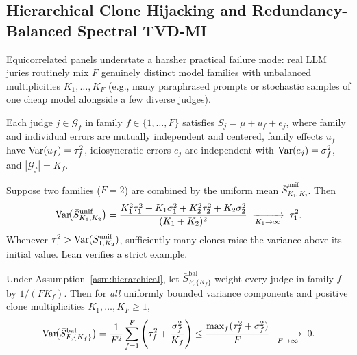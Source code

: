 \subsection{Hierarchical Clone Hijacking and Redundancy-Balanced Spectral TVD-MI}
\label{sec:rb-spec}

Equicorrelated panels understate a harsher practical failure mode: real LLM
juries routinely mix $F$ genuinely distinct model families with unbalanced
multiplicities $K_1, \dots, K_F$ (e.g., many paraphrased prompts or stochastic
samples of one cheap model alongside a few diverse judges).

\begin{assumption}
\label{asm:hierarchical}
Each judge $j \in \mathcal{G}_f$ in family $f \in \{1,\dots,F\}$ satisfies
$S_j = \mu + u_f + e_j$, where family and individual errors are mutually independent and centered, family effects $u_f$ have
$\mathrm{Var}(u_f) = \tau_f^2$, idiosyncratic errors $e_j$ are independent with
$\mathrm{Var}(e_j) = \sigma_f^2$, and $|\mathcal{G}_f| = K_f$.
\end{assumption}

\begin{proposition}
\label{prop:clone-hijacking}
Suppose two families ($F=2$) are combined by the uniform mean
$\bar{S}^{\mathrm{unif}}_{K_1, K_2}$. Then
\begin{equation}
\label{eq:clone-hijack}
\mathrm{Var}\!\big(\bar{S}^{\mathrm{unif}}_{K_1, K_2}\big)
= \frac{K_1^2 \tau_1^2 + K_1 \sigma_1^2 + K_2^2 \tau_2^2 + K_2 \sigma_2^2}{(K_1 + K_2)^2}
\;\xrightarrow[K_1 \to \infty]{}\; \tau_1^2.
\end{equation}
Whenever $\tau_1^2 > \mathrm{Var}(\bar{S}^{\mathrm{unif}}_{1, K_2})$, sufficiently many clones raise the variance above its initial value. Lean verifies a strict example.
\end{proposition}

\begin{theorem}
\label{thm:balanced-1F}
Under Assumption~\ref{asm:hierarchical}, let $\bar{S}^{\mathrm{bal}}_{F, \{K_f\}}$
weight every judge in family $f$ by $1 / (F K_f)$. Then for \emph{all}
uniformly bounded variance components and positive clone multiplicities $K_1, \dots, K_F \ge 1$,
\begin{equation}
\label{eq:balanced-inv-F}
\mathrm{Var}\!\big(\bar{S}^{\mathrm{bal}}_{F, \{K_f\}}\big)
= \frac{1}{F^2}\sum_{f=1}^F \left(\tau_f^2 + \frac{\sigma_f^2}{K_f}\right)
\le \frac{\max_f(\tau_f^2 + \sigma_f^2)}{F}
\;\xrightarrow[F \to \infty]{}\; 0.
\end{equation}
\end{theorem}

